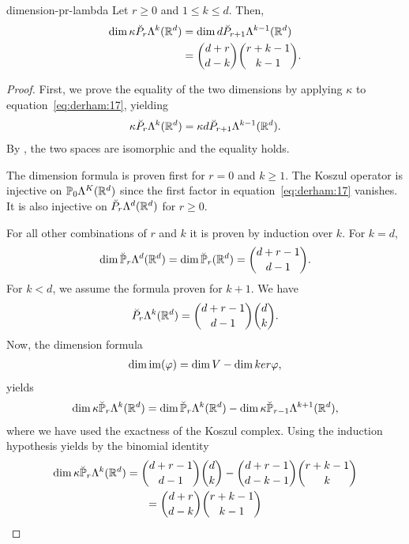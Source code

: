 \begin{Theorem}{dimension-pr-lambda}
  Let $r\ge 0$ and $1\le k \le d$. Then,
  \begin{gather}
    \begin{split}
      \dim \kappa \breve P_r\Lambda^k(\mathbb R^d)
      & = \dim d \breve P_{r+1}\Lambda^{k-1}(\mathbb R^d)
      \\
      &= \binom{d+r}{d-k}\binom{r+k-1}{k-1}.
    \end{split}
  \end{gather}
\end{Theorem}

\begin{proof}
  First, we prove the equality of the two dimensions by applying $\kappa$
  to equation~\eqref{eq:derham:17}, yielding
  \begin{gather*}
    \kappa \breve P_r\Lambda^k(\mathbb R^d)
    = \kappa d \breve P_{r+1}\Lambda^{k-1}(\mathbb R^d).
  \end{gather*}
  By , the two spaces are
  isomorphic and the equality holds.

  The dimension formula is proven first for $r=0$ and $k\ge 1$. The
  Koszul operator is injective on $\mathbb P_0\Lambda^K(\mathbb R^d)$ since the
  first factor in equation~\eqref{eq:derham:17} vanishes. It is
  also injective on $\breve P_r\Lambda^d(\mathbb R^d)$ for $r\ge 0$.

  For all other combinations of $r$ and $k$ it is proven by induction
  over $k$. For $k=d$,
  \begin{gather*}
    \dim \breve{\mathbb P}_r\Lambda^d(\mathbb R^d) = \dim\breve{\mathbb P}_r(\mathbb R^d)
    = \binom{d+r-1}{d-1}.
  \end{gather*}
  For $k<d$, we assume the formula proven for $k+1$. We have
  \begin{gather*}
    \breve P_r\Lambda^k(\mathbb R^d) = \binom{d+r-1}{d-1}\binom{d}{k}.
  \end{gather*}
  Now, the dimension formula
  \begin{gather*}
    \dim \operatorname{im}(\varphi) = \dim V - \dim ker \varphi,
  \end{gather*}
  yields
  \begin{gather*}
    \dim\kappa\breve {\mathbb P}_r\Lambda^k(\mathbb R^d) =
    \dim\breve {\mathbb P}_r\Lambda^k(\mathbb R^d)
    - \dim\kappa\breve {\mathbb P}_{r-1}\Lambda^{k+1}(\mathbb R^d),
  \end{gather*}
  where we have used the exactness of the Koszul complex.
  Using the induction hypothesis yields by the binomial identity
  \begin{multline*}
    \dim\kappa\breve {\mathbb P}_r\Lambda^k(\mathbb R^d) =
    \binom{d+r-1}{d-1}\binom{d}{k}
    - \binom{d+r-1}{d-k-1}\binom{r+k-1}{k}
    \\
    = \binom{d+r}{d-k}\binom{r+k-1}{k-1}
  \end{multline*}
\end{proof}




